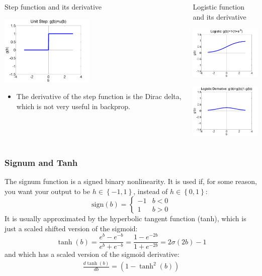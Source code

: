 \documentclass{beamer}
\begin{document}
\begin{frame}
  \begin{columns}[t]
    \column{2.25in}
    \begin{block}{Step function and its derivative}
      \centerline{\includegraphics[width=1.75in]{figs/nn_unitstep.png}}
      \begin{itemize}
      \item The derivative of the step function is the Dirac
        delta, which is not very useful in backprop.
      \end{itemize}
    \end{block}
    \column{2.25in}
    \begin{block}{Logistic function and its derivative}
      \centerline{\includegraphics[width=1.75in]{figs/nn_logistic.png}}
      \centerline{\includegraphics[width=1.75in]{figs/nn_logisticprime.png}}
    \end{block}
  \end{columns}
\end{frame}

\begin{frame}
  \frametitle{Signum and Tanh}

  The signum function is a signed binary nonlinearity.  It is used if,
  for some reason, you want your output to be
  $h\in\left\{-1,1\right\}$, instead of $h\in\left\{0,1\right\}$:
  \[
  \mbox{sign}(b)=\begin{cases}
  -1 & b<0\\
  1 & b>0
  \end{cases}
  \]
  It is usually approximated by the hyperbolic tangent function
  (tanh), which is just a scaled shifted version of the sigmoid:
  \begin{displaymath}
    \tanh(b) = \frac{e^b-e^{-b}}{e^b+e^{-b}}
    = \frac{1-e^{-2b}}{1+e^{-2b}}
    = 2\sigma(2b)-1
  \end{displaymath}
  and which has a scaled version of the sigmoid derivative:
  \begin{align*}
    \frac{d\tanh(b)}{db} =\left(1-\tanh^2(b)\right)
  \end{align*}
\end{frame}
\end{document}
